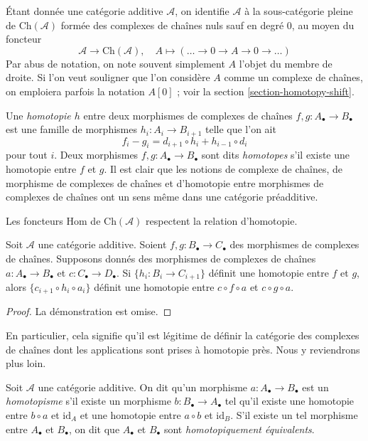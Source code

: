 \medskip\noindent
Étant donnée une catégorie additive $\mathcal{A}$, on identifie $\mathcal{A}$
à la sous-catégorie pleine de $\text{Ch}(\mathcal{A})$ formée
des complexes de chaînes nuls sauf en degré $0$, au moyen du foncteur
$$
\mathcal{A} \longrightarrow \text{Ch}(\mathcal{A}),\quad
A \longmapsto (\ldots \to 0 \to A \to 0 \to \ldots)
$$
Par abus de notation, on note souvent simplement $A$ l'objet du membre de droite.
Si l'on veut souligner que l'on considère $A$ comme un complexe de chaînes,
on emploiera parfois la notation $A[0]$ ; voir la
section \ref{section-homotopy-shift}.

\medskip\noindent
Une {\it homotopie $h$} entre deux morphismes
de complexes de chaînes $f, g : A_\bullet \to B_\bullet$
est une famille de morphismes $h_i : A_i \to B_{i + 1}$
telle que l'on ait
$$
f_i - g_i = d_{i + 1} \circ h_i + h_{i - 1} \circ d_i
$$
pour tout $i$.
Deux morphismes $f, g : A_\bullet \to B_\bullet$ sont dits
{\it homotopes} s'il existe une homotopie entre $f$
et $g$.
Il est clair que les notions de complexe de chaînes, de morphisme de
complexes de chaînes et d'homotopie entre morphismes de complexes de chaînes
ont un sens même dans une catégorie préadditive.

\begin{lemma}
\label{lemma-compose-homotopy}
\begin{slogan}
Les foncteurs Hom de $\text{Ch}(\mathcal{A})$ respectent la relation d'homotopie.
\end{slogan}
Soit $\mathcal{A}$ une catégorie additive.
Soient $f, g : B_\bullet \to C_\bullet$ des morphismes
de complexes de chaînes. Supposons donnés des morphismes de complexes
de chaînes $a : A_\bullet \to B_\bullet$ et
$c : C_\bullet \to D_\bullet$.
Si $\{h_i : B_i \to C_{i + 1}\}$ définit une homotopie
entre $f$ et $g$, alors $\{c_{i + 1} \circ h_i \circ a_i\}$
définit une homotopie entre $c \circ f \circ a$ et
$c \circ g \circ a$.
\end{lemma}

\begin{proof}
La démonstration est omise.
\end{proof}

\noindent
En particulier, cela signifie qu'il est légitime de définir
la catégorie des complexes de chaînes dont les applications sont prises à homotopie près.
Nous y reviendrons plus loin.

\begin{definition}
\label{definition-homotopy-equivalent}
Soit $\mathcal{A}$ une catégorie additive.
On dit qu'un morphisme $a : A_\bullet \to B_\bullet$
est un {\it homotopisme} s'il existe
un morphisme $b : B_\bullet \to A_\bullet$
tel qu'il existe une homotopie entre
$b \circ a$ et $\text{id}_A$
et une homotopie entre $a \circ b$ et $\text{id}_B$.
S'il existe un tel morphisme entre $A_\bullet$ et $B_\bullet$, on
dit que $A_\bullet$ et $B_\bullet$ sont {\it homotopiquement équivalents}.
\end{definition}


